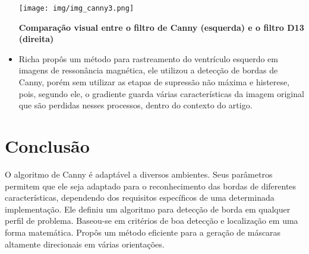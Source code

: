 \documentclass[a4paper,12pt]{article}
\begin{document}
\begin{itemize}
        \texttt{[image: img/img\_canny3.png]}

        \textbf{Comparação visual entre o filtro de Canny (esquerda) e o
            filtro D13 (direita)}


        \item Richa\cite{VAR4} propôs um método para rastreamento do
        ventrículo esquerdo em imagens de ressonância magnética, ele
        utilizou a detecção de bordas de Canny, porém sem utilizar as etapas
        de supressão não máxima e histerese, pois, segundo ele, o gradiente
        guarda várias características da imagem original que são perdidas
        nesses processos, dentro do contexto do artigo.

    \end{itemize}

\section{\textbf{Conclusão}}

O algoritmo de Canny\cite{CANNY} é adaptável a diversos ambientes. Seus
parâmetros permitem que ele seja adaptado para o reconhecimento das bordas de 
diferentes características, dependendo dos requisitos específicos de uma
determinada implementação. Ele definiu um algoritmo para detecção de borda
em qualquer perfil de problema. Baseou-se em critérios de boa detecção e
localização em uma forma matemática. Propôs um método eficiente para
a geração de máscaras altamente direcionais em várias orientações. 



\end{document}
